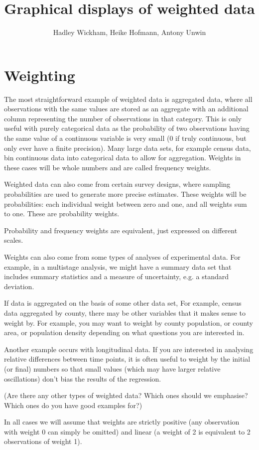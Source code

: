 \documentclass[oneside,letterpaper]{scrartcl}
\title{Graphical displays of weighted data}
\author{Hadley Wickham, Heike Hofmann, Antony Unwin}
\begin{document}
\section{Weighting}\label{sec:introduction}

The most straightforward example of weighted data is aggregated data, where all observations with the same values are stored as an aggregate with an additional column representing the number of observations in that category.  This is only useful with purely categorical data as the probability of two observations having the same value of a continuous variable is very small (0 if truly continuous, but only ever have a finite precision).  Many large data sets, for example census data, bin continuous data into categorical data to allow for aggregation.  Weights in these cases will be whole numbers and are called frequency weights.

Weighted data can also come from certain survey designs, where sampling probabilities are used to generate more precise estimates.  These weights will be probabilities: each individual weight between zero and one, and all weights sum to one.  These are probability weights.

Probability and frequency weights are equivalent, just expressed on different scales. 

Weights can also come from some types of analyses of experimental data.  For example, in a multistage analysis, we might have a summary data set that includes summary statistics and a measure of uncertainty, e.g. a standard deviation.

If data is aggregated on the basis of some other data set,  For example, census data aggregated by county, there may be other variables that it makes sense to weight by.  For example, you may want to weight by county population, or county area, or population density depending on what questions you are interested in.

Another example occurs with longitudinal data.  If you are interested in analysing relative differences between time points, it is often useful to weight by the initial (or final) numbers so that small values (which may have larger relative oscillations) don't bias the results of the regression.

(Are there any other types of weighted data?  Which ones should we emphasise? Which ones do you have good examples for?)

In all cases we will assume that weights are strictly positive (any observation with weight 0 can simply be omitted) and linear (a weight of 2 is equivalent to 2 observations of weight 1).
\end{document}
